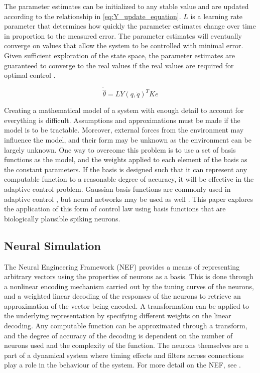 \documentclass[letterpaper, 10 pt, conference]{ieeeconf}  %
\begin{document}
The parameter estimates can be initialized to any stable value and are updated according to the relationship in \eqref{eq:Y_update_equation}.
$L$ is a learning rate parameter that determines how quickly the parameter estimates change over time in proportion to the measured error.
The parameter estimates will eventually converge on values that allow the system to be controlled with minimal error.
Given sufficient exploration of the state space, the parameter estimates are guaranteed to converge to the real values if the real values are required for optimal control \cite{slotine1987adaptive}.

\begin{equation} \label{eq:Y_update_equation}
\dot{\hat{\theta}} = LY(q,\dot{q})^{T}Ke
\end{equation}


Creating a mathematical model of a system with enough detail to account for everything is difficult. 
Assumptions and approximations must be made if the model is to be tractable. 
Moreover, external forces from the environment may influence the model, and their form may be unknown as the environment can be largely unknown. 
One way to overcome this problem is to use a set of basis functions as the model, and the weights applied to each element of the basis as the constant parameters. 
If the basis is designed such that it can represent any computable function to a reasonable degree of accuracy, it will be effective in the adaptive control problem. 
Gaussian basis functions are commonly used in adaptive control \cite{sanner1992gaussian}, but neural networks may be used as well \cite{barto1983neuronlike}.
This paper explores the application of this form of control law using basis functions that are biologically plausible spiking neurons.

\subsection{Neural Simulation}

The Neural Engineering Framework (NEF)\cite{eliasmith2004neural} provides a means of representing arbitrary vectors using the properties of neurons as a basis.
This is done through a nonlinear encoding mechanism carried out by the tuning curves of the neurons, and a weighted linear decoding of the responses of the neurons to retrieve an approximation of the vector being encoded.
A transformation can be applied to the underlying representation by specifying different weights on the linear decoding.
Any computable function can be approximated through a transform, and the degree of accuracy of the decoding is dependent on the number of neurons used and the complexity of the function.
The neurons themselves are a part of a dynamical system where timing effects and filters across connections play a role in the behaviour of the system. 
For more detail on the NEF, see \cite{eliasmith2007build, stewart2011neural, eliasmith2013build}. %
\end{document}
